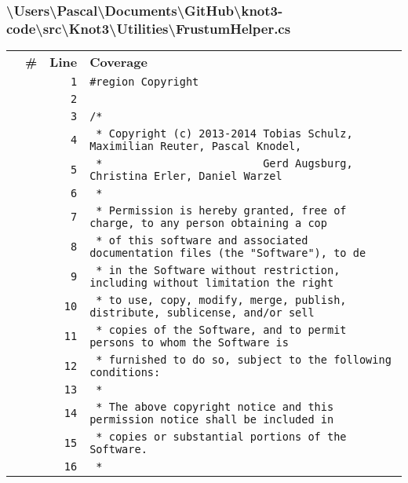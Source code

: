 \documentclass[a4paper,10pt]{article}
\begin{document}
\subsubsection{\textbackslash Users\textbackslash Pascal\textbackslash Documents\textbackslash GitHub\textbackslash knot3-code\textbackslash src\textbackslash Knot3\textbackslash Utilities\textbackslash FrustumHelper.cs}
\begin{longtable}[l]{lrrl}
\textbf{} & \textbf{\#} & \textbf{Line} & \textbf{Coverage}\\
\cellcolor{gray} &  & \verb~1~ & \verb~#region Copyright~\\
\cellcolor{gray} &  & \verb~2~ & \verb~~\\
\cellcolor{gray} &  & \verb~3~ & \verb~/*~\\
\cellcolor{gray} &  & \verb~4~ & \verb~ * Copyright (c) 2013-2014 Tobias Schulz, Maximilian Reuter, Pascal Knodel,~\\
\cellcolor{gray} &  & \verb~5~ & \verb~ *                         Gerd Augsburg, Christina Erler, Daniel Warzel~\\
\cellcolor{gray} &  & \verb~6~ & \verb~ *~\\
\cellcolor{gray} &  & \verb~7~ & \verb~ * Permission is hereby granted, free of charge, to any person obtaining a cop~\\
\cellcolor{gray} &  & \verb~8~ & \verb~ * of this software and associated documentation files (the "Software"), to de~\\
\cellcolor{gray} &  & \verb~9~ & \verb~ * in the Software without restriction, including without limitation the right~\\
\cellcolor{gray} &  & \verb~10~ & \verb~ * to use, copy, modify, merge, publish, distribute, sublicense, and/or sell~\\
\cellcolor{gray} &  & \verb~11~ & \verb~ * copies of the Software, and to permit persons to whom the Software is~\\
\cellcolor{gray} &  & \verb~12~ & \verb~ * furnished to do so, subject to the following conditions:~\\
\cellcolor{gray} &  & \verb~13~ & \verb~ *~\\
\cellcolor{gray} &  & \verb~14~ & \verb~ * The above copyright notice and this permission notice shall be included in ~\\
\cellcolor{gray} &  & \verb~15~ & \verb~ * copies or substantial portions of the Software.~\\
\cellcolor{gray} &  & \verb~16~ & \verb~ *~\\

\end{longtable}
\end{document}
